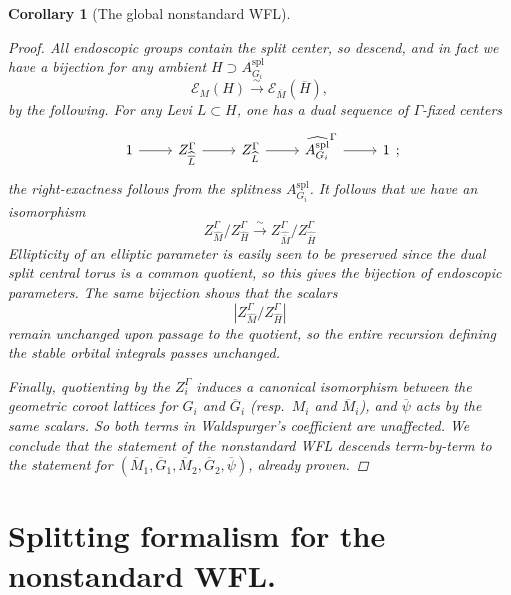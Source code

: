 \documentclass[openany]{amsbook}
\newtheorem{corollary}[theorem]{Corollary}
\theoremstyle{definition}
\theoremstyle{remark}
\numberwithin{equation}{section}
\newcommand{\cE}{\mathcal{E}}
\newcommand{\ol}[1]{\overline{#1}}
\renewcommand{\-}{\operatorname{-}}
\newcommand{\spl}{\mathrm{spl}}
\begin{document}
\begin{corollary}[The global nonstandard WFL]
\begin{proof}
        All endoscopic groups contain the split center, so descend, and in fact we have a bijection for any ambient $H \supset A_{G_i}^\spl$
        $$
            \cE_{M}(H) \xrightarrow{\sim} \cE_{\ol{M}}(\ol{H}),
        $$
        by the following. For any Levi $L \subset H$, one has a dual sequence of $\Gamma$-fixed centers
        $$
            \begin{tikzcd}
                1 \ar[r] & Z_{\widehat{\ol{L}}}^\Gamma \ar[r] & Z_{\widehat{L}}^\Gamma \ar[r] & \widehat{A_{G_i}^\spl}^\Gamma \ar[r] & 1
            \end{tikzcd};
        $$
        the right-exactness follows from the splitness $A_{G_i}^\spl$. It follows that we have an isomorphism
        $$
            Z_{\widehat{M}}^\Gamma/Z_{\widehat{H}}^\Gamma \xrightarrow{\sim} Z_{\widehat{\ol{M}}}^\Gamma/Z_{\widehat{\ol{H}}}^\Gamma
        $$
        Ellipticity of an elliptic parameter is easily seen to be preserved since the dual split central torus is a common quotient, so this gives the bijection of endoscopic parameters. The same bijection shows that the scalars
        $$
            |Z^\Gamma_{\widehat{M}}/Z^\Gamma_{\widehat{H}}|
        $$
        remain unchanged upon passage to the quotient, so the entire recursion defining the stable orbital integrals passes unchanged. 

        Finally, quotienting by the $Z_i^\Gamma$ induces a canonical isomorphism between the geometric coroot lattices for $G_i$ and $\ol{G}_i$ (resp.\ $M_i$ and $\ol{M}_i$), and $\ol{\psi}$ acts by the same scalars. So both terms in Waldspurger's coefficient are unaffected. We conclude that the statement of the nonstandard WFL descends term-by-term to the statement for $(\ol{M}_1, \ol{G}_1, \ol{M}_2, \ol{G}_2, \ol{\psi})$, already proven.



                                                                        
        

        
                
                                                                            \end{proof}
\end{corollary}






\section{Splitting formalism for the nonstandard WFL.}\label{subsect.nonstd.splitting}
\end{document}
